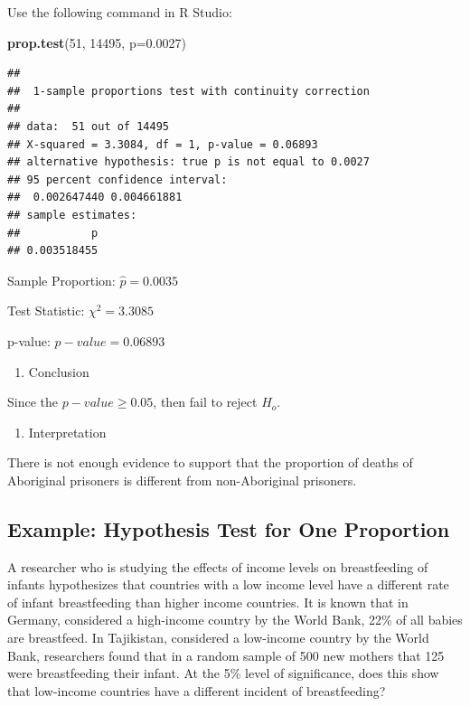 \documentclass[]{book}
\newenvironment{Shaded}{\begin{snugshade}}{\end{snugshade}}
\newcommand{\DataTypeTok}[1]{\textcolor[rgb]{0.13,0.29,0.53}{#1}}
\newcommand{\DecValTok}[1]{\textcolor[rgb]{0.00,0.00,0.81}{#1}}
\newcommand{\FloatTok}[1]{\textcolor[rgb]{0.00,0.00,0.81}{#1}}
\newcommand{\KeywordTok}[1]{\textcolor[rgb]{0.13,0.29,0.53}{\textbf{#1}}}
\newcommand{\NormalTok}[1]{#1}
\providecommand{\tightlist}{%
  \setlength{\itemsep}{0pt}\setlength{\parskip}{0pt}}
\begin{document}
Use the following command in R Studio:

\begin{Shaded}
\begin{Highlighting}[]
\KeywordTok{prop.test}\NormalTok{(}\DecValTok{51}\NormalTok{, }\DecValTok{14495}\NormalTok{, }\DataTypeTok{p=}\FloatTok{0.0027}\NormalTok{)}
\end{Highlighting}
\end{Shaded}

\begin{verbatim}
## 
##  1-sample proportions test with continuity correction
## 
## data:  51 out of 14495
## X-squared = 3.3084, df = 1, p-value = 0.06893
## alternative hypothesis: true p is not equal to 0.0027
## 95 percent confidence interval:
##  0.002647440 0.004661881
## sample estimates:
##           p 
## 0.003518455
\end{verbatim}

Sample Proportion: \(\hat{p}=0.0035\)

Test Statistic: \(\chi^2=3.3085\)

p-value: \(p-value=0.06893\)

\begin{enumerate}
\def\labelenumi{\arabic{enumi}.}
\setcounter{enumi}{4}
\tightlist
\item
  Conclusion
\end{enumerate}

Since the \(p-value\ge0.05\), then fail to reject \(H_o\).

\begin{enumerate}
\def\labelenumi{\arabic{enumi}.}
\setcounter{enumi}{5}
\tightlist
\item
  Interpretation
\end{enumerate}

There is not enough evidence to support that the proportion of deaths of Aboriginal prisoners is different from non-Aboriginal prisoners.

\hypertarget{example-hypothesis-test-for-one-proportion-1}{%
\subsection{Example: Hypothesis Test for One Proportion}\label{example-hypothesis-test-for-one-proportion-1}}

A researcher who is studying the effects of income levels on breastfeeding of infants hypothesizes that countries with a low income level have a different rate of infant breastfeeding than higher income countries. It is known that in Germany, considered a high-income country by the World Bank, 22\% of all babies are breastfeed. In Tajikistan, considered a low-income country by the World Bank, researchers found that in a random sample of 500 new mothers that 125 were breastfeeding their infant. At the 5\% level of significance, does this show that low-income countries have a different incident of breastfeeding?
\end{document}

